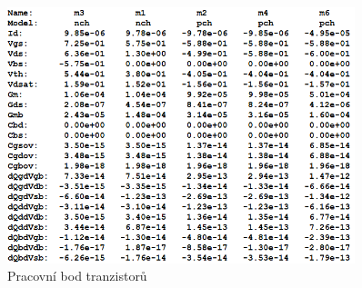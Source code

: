 \vspace{10mm}
\begin{figure}[h!]
    \centering
    \includegraphics[width=0.9\textwidth]{text/img/PR-op-ol.png}
    \caption{\label{fig:KPZ-op-ol} Pracovní bod tranzistorů}
\end{figure}

